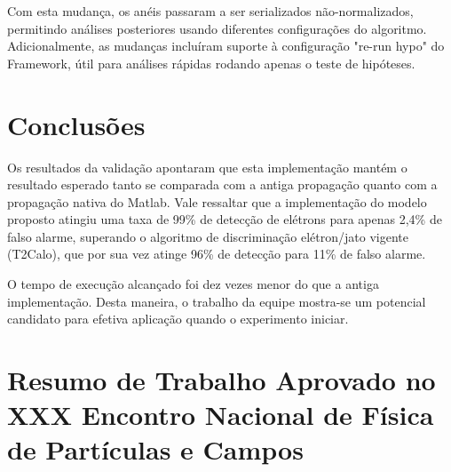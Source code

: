 \documentclass[a4paper,10pt,titlepage]{article}
\begin{document}
Com esta mudança, os anéis passaram a ser serializados não-normalizados, permitindo análises posteriores usando diferentes configurações do algoritmo.
Adicionalmente, as mudanças incluíram suporte à configuração "re-run hypo" do Framework, útil para análises rápidas rodando apenas o teste de hipóteses.


\section{Conclusões}

Os resultados da validação apontaram que esta implementação mantém o resultado esperado tanto se comparada com a antiga propagação quanto com a propagação nativa do Matlab.
Vale ressaltar que a implementação do modelo proposto atingiu uma taxa de 99\% de detecção de elétrons para apenas 2,4\% de falso alarme, superando o algoritmo de discriminação elétron/jato vigente (T2Calo), que por sua vez atinge 96\% de detecção para 11\% de falso alarme.

O tempo de execução alcançado foi dez vezes menor do que a antiga implementação.
Desta maneira, o trabalho da equipe mostra-se um potencial candidato para efetiva aplicação quando o experimento iniciar.

\pagebreak

%
%

\appendix

\section{Resumo de Trabalho Aprovado no XXX Encontro Nacional de Física de Partículas e Campos}
\end{document}
